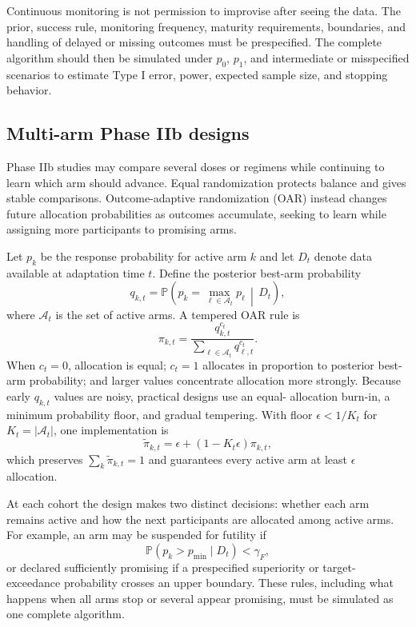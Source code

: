 \documentclass[12pt,oneside]{book}
\numberwithin{equation}{section}
\theoremstyle{definition}
\theoremstyle{plain}
\theoremstyle{remark}
\newcommand{\Prob}{\mathbb{P}}
\newcommand{\given}{\,\middle|\,}
\begin{document}
Continuous monitoring is not permission to improvise after seeing the data.
The prior, success rule, monitoring frequency, maturity requirements, boundaries,
and handling of delayed or missing outcomes must be prespecified.  The complete
algorithm should then be simulated under $p_0$, $p_1$, and intermediate or
misspecified scenarios to estimate Type I error, power, expected sample size,
and stopping behavior.

\subsection{Multi-arm Phase IIb designs}

Phase IIb studies may compare several doses or regimens while continuing to
learn which arm should advance.  Equal randomization protects balance and gives
stable comparisons.  Outcome-adaptive randomization (OAR) instead changes
future allocation probabilities as outcomes accumulate, seeking to learn while
assigning more participants to promising arms.

Let $p_k$ be the response probability for active arm $k$ and let $D_t$ denote
data available at adaptation time $t$.  Define the posterior best-arm
probability
\[
  q_{k,t}=\Prob\!\left(p_k=\max_{\ell\in\mathcal A_t}p_\ell
                       \given D_t\right),
\]
where $\mathcal A_t$ is the set of active arms.  A tempered OAR rule is
\begin{equation}
  \pi_{k,t}
  =\frac{q_{k,t}^{c_t}}{\sum_{\ell\in\mathcal A_t}q_{\ell,t}^{c_t}}.
  \label{eq:oar-tempered}
\end{equation}
When $c_t=0$, allocation is equal; $c_t=1$ allocates in proportion to posterior
best-arm probability; and larger values concentrate allocation more strongly.
Because early $q_{k,t}$ values are noisy, practical designs use an equal-
allocation burn-in, a minimum probability floor, and gradual tempering.  With
floor $\epsilon<1/K_t$ for $K_t=|\mathcal A_t|$, one implementation is
\[
  \widetilde\pi_{k,t}
  =\epsilon+(1-K_t\epsilon)\pi_{k,t},
\]
which preserves $\sum_k\widetilde\pi_{k,t}=1$ and guarantees every active arm
at least $\epsilon$ allocation.

At each cohort the design makes two distinct decisions: whether each arm
remains active and how the next participants are allocated among active arms.
For example, an arm may be suspended for futility if
\[
  \Prob(p_k>p_{\min}\mid D_t)<\gamma_F,
\]
or declared sufficiently promising if a prespecified superiority or target-
exceedance probability crosses an upper boundary.  These rules, including what
happens when all arms stop or several appear promising, must be simulated as
one complete algorithm.
\end{document}
